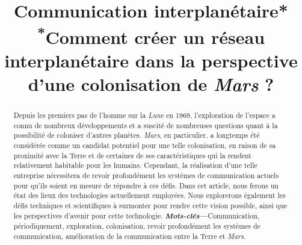 \documentclass[conference]{IEEEtran}
\begin{document}
\title{Communication interplanétaire*\\
{\footnotesize \textsuperscript{*}Comment créer un réseau interplanétaire dans la perspective d'une colonisation de \emph{Mars} ?}
}

\author{
}

\maketitle

\begin{abstract}
Depuis les premiers pas de l'homme sur la \emph{Lune} en 1969, l'exploration de l'espace a connu de nombreux développements et a suscité de nombreuses questions quant à la possibilité de coloniser d'autres planètes. \emph{Mars}, en particulier, a longtemps été considérée comme un candidat potentiel pour une telle colonisation, en raison de sa proximité avec la Terre et de certaines de ses caractéristiques qui la rendent relativement habitable pour les humains. Cependant, la réalisation d'une telle entreprise nécessitera de revoir profondément les systèmes de communication actuels pour qu'ils soient en mesure de répondre à ces défis.
Dans cet article, nous ferons un état des lieux des technologies actuellement employées. Nous explorerons également les défis techniques et scientifiques à surmonter pour rendre cette vision possible, ainsi que les perspectives d'avenir pour cette technologie.
\newline\textbf{\textit{\hphantom{idt}Mots-clés—}}Communication, périodiquement, exploration, colonisation, revoir profondément les systèmes de communication, amélioration de la communication entre la Terre et \emph{Mars}.
\end{abstract}
\end{document}

